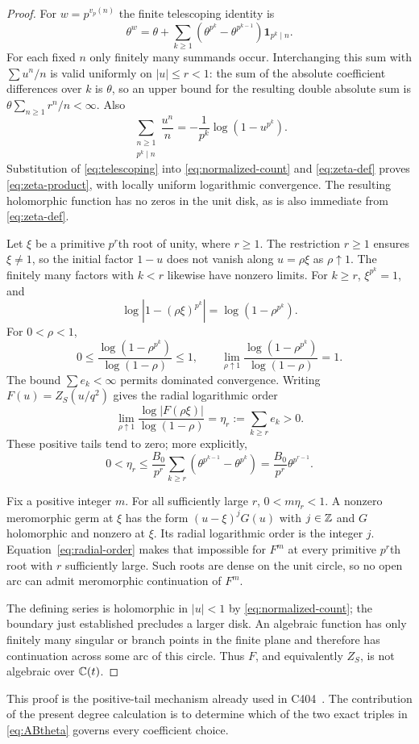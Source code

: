 \begin{proof}
For $w=p^{v_p(n)}$ the finite telescoping identity is
\begin{equation}\label{eq:telescoping}
 \theta^w=\theta+
 \sum_{k\ge1}\left(\theta^{p^k}-\theta^{p^{k-1}}\right)
               \mathbf1_{p^k\mid n}.
\end{equation}
For each fixed $n$ only finitely many summands occur. Interchanging
this sum with $\sum u^n/n$ is valid uniformly on $|u|\le r<1$:
the sum of the absolute coefficient differences over $k$ is $\theta$,
so an upper bound for the resulting double absolute sum is
$\theta\sum_{n\ge1}r^n/n<\infty$. Also
\[
 \sum_{\substack{n\ge1\\p^k\mid n}}\frac{u^n}{n}
 =-\frac1{p^k}\log(1-u^{p^k}).
\]
Substitution of \eqref{eq:telescoping} into
\eqref{eq:normalized-count} and \eqref{eq:zeta-def} proves
\eqref{eq:zeta-product}, with locally uniform logarithmic
convergence. The resulting holomorphic function has no zeros
in the unit disk, as is also immediate from \eqref{eq:zeta-def}.

Let $\xi$ be a primitive $p^r$th root of unity, where $r\ge1$.
The restriction $r\ge1$ ensures $\xi\ne1$, so the initial
factor $1-u$ does not vanish along $u=\rho\xi$ as
$\rho\uparrow1$. The finitely many factors with $k<r$ likewise
have nonzero limits. For $k\ge r$, $\xi^{p^k}=1$, and
\[
 \log|1-(\rho\xi)^{p^k}|=\log(1-\rho^{p^k}).
\]
For $0<\rho<1$,
\[
 0\le\frac{\log(1-\rho^{p^k})}{\log(1-\rho)}\le1,
 \qquad
 \lim_{\rho\uparrow1}
 \frac{\log(1-\rho^{p^k})}{\log(1-\rho)}=1.
\]
The bound $\sum e_k<\infty$ permits dominated convergence.
Writing $F(u)=Z_S(u/q^2)$ gives the radial logarithmic order
\begin{equation}\label{eq:radial-order}
 \lim_{\rho\uparrow1}
 \frac{\log|F(\rho\xi)|}{\log(1-\rho)}
 =\eta_r:=\sum_{k\ge r}e_k>0.
\end{equation}
These positive tails tend to zero; more explicitly,
\begin{equation}\label{eq:eta-bound}
 0<\eta_r\le
 \frac{B_0}{p^r}\sum_{k\ge r}
       (\theta^{p^{k-1}}-\theta^{p^k})
 =\frac{B_0}{p^r}\theta^{p^{r-1}}.
\end{equation}

Fix a positive integer $m$. For all sufficiently large $r$,
$0<m\eta_r<1$. A nonzero meromorphic germ at $\xi$ has the
form $(u-\xi)^j G(u)$ with $j\in\mathbb Z$ and $G$ holomorphic and
nonzero at $\xi$. Its radial logarithmic order is the integer
$j$. Equation~\eqref{eq:radial-order} makes that impossible
for $F^m$ at every primitive $p^r$th root with $r$ sufficiently
large. Such roots are dense on the unit circle, so no open arc
can admit meromorphic continuation of $F^m$.

The defining series is holomorphic in $|u|<1$ by
\eqref{eq:normalized-count}; the boundary just established
precludes a larger disk. An algebraic function has only finitely
many singular or branch points in the finite plane and therefore
has continuation across some arc of this circle. Thus $F$, and
equivalently $Z_S$, is not algebraic over $\mathbb C(t)$.
\end{proof}

This proof is the positive-tail mechanism already used in
C404~\cite{C404}. The contribution of the present degree calculation
is to determine which of the two exact triples in
\eqref{eq:ABtheta} governs every coefficient choice.
